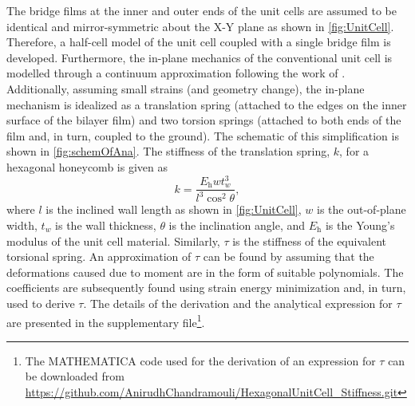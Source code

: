 \documentclass[final,times,5p]{elsarticle}
\numberwithin{equation}{section}
\begin{document}
The bridge films at the inner and outer ends of the unit cells are assumed to be identical and mirror-symmetric about the X-Y plane as shown in \cref{fig:UnitCell}. Therefore, a half-cell model of the unit cell coupled with a single bridge film is developed. 
Furthermore, the in-plane mechanics of the conventional unit cell is modelled through a continuum approximation following the work of \citet{gibson_ashby_1997}. Additionally, assuming small strains (and geometry change), the in-plane mechanism is idealized as a translation spring (attached to the edges on the inner surface of the bilayer film) and two torsion springs (attached to both ends of the film and, in turn, coupled to the ground). The schematic of this simplification is shown in \cref{fig:schemOfAna}. The stiffness of the translation spring, $k$, for a hexagonal honeycomb is given as \citep{gibson_ashby_1997}
\begin{equation}
    k=\frac{E_\mathrm{h} w t_w^3}{l^3 \cos^2{\theta}},
\end{equation}
where $l$ is the inclined wall length as shown in \cref{fig:UnitCell}, $w$ is the out-of-plane width, $t_w$ is the wall thickness, $\theta$ is the inclination angle, and $E_\mathrm{h}$ is the Young's modulus of the unit cell material. Similarly, $\tau$ is the stiffness of the equivalent torsional spring. An approximation of $\tau$ can be found by assuming that the deformations caused due to moment are in the form of suitable polynomials. The coefficients are subsequently found using strain energy minimization and, in turn, used to derive $\tau$. The details of the derivation and the analytical expression for $\tau$ are presented in the supplementary file\footnote{The MATHEMATICA code used for the derivation of an expression for $\tau$ can be downloaded from \href{https://github.com/AnirudhChandramouli/HexagonalUnitCell\_Stiffness.git}{https://github.com/AnirudhChandramouli/HexagonalUnitCell\_Stiffness.git}}.
\end{document}
